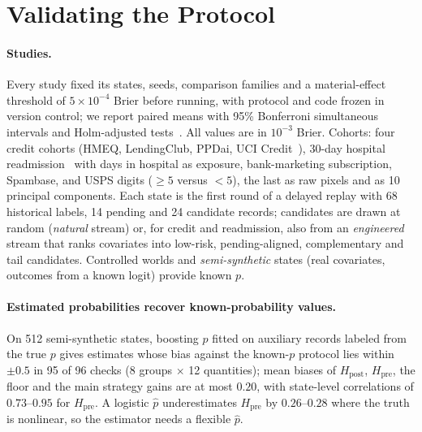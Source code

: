 \documentclass[runningheads]{llncs}
\begin{document}
\section{Validating the Protocol}
\label{sec:validation}
\paragraph{Studies.} Every study fixed its states, seeds, comparison families and a material-effect threshold of $5\times10^{-4}$ Brier before running, with protocol and code frozen in version control; we report paired means with 95\% Bonferroni simultaneous intervals and Holm-adjusted tests~\cite{holm1979simple}. All values are in $10^{-3}$ Brier. Cohorts: four credit cohorts (HMEQ, LendingClub, PPDai, UCI Credit~\cite{sasHMEQ,lendingclubSource,ppdaiSource,he2018ensemble,yeh2009comparison}), 30-day hospital readmission~\cite{strack2014impact} with days in hospital as exposure, bank-marketing subscription, Spambase, and USPS digits ($\ge5$ versus $<5$), the last as raw pixels and as 10 principal components. Each state is the first round of a delayed replay with 68 historical labels, 14 pending and 24 candidate records; candidates are drawn at random (\emph{natural} stream) or, for credit and readmission, also from an \emph{engineered} stream that ranks covariates into low-risk, pending-aligned, complementary and tail candidates. Controlled worlds and \emph{semi-synthetic} states (real covariates, outcomes from a known logit) provide known $p$.

\paragraph{Estimated probabilities recover known-probability values.} On 512 semi-synthetic states, boosting $\hat p$ fitted on auxiliary records labeled from the true $p$ gives estimates whose bias against the known-$p$ protocol lies within $\pm0.5$ in 95 of 96 checks (8 groups $\times$ 12 quantities); mean biases of $H_{\mathrm{post}}$, $H_{\mathrm{pre}}$, the floor and the main strategy gains are at most $0.20$, with state-level correlations of $0.73$--$0.95$ for $H_{\mathrm{pre}}$. A logistic $\hat p$ underestimates $H_{\mathrm{pre}}$ by $0.26$--$0.28$ where the truth is nonlinear, so the estimator needs a flexible $\hat p$.
\end{document}
